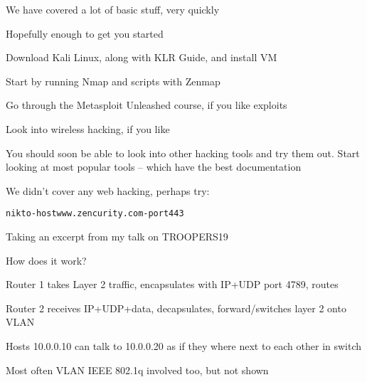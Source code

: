 \documentclass[Screen16to9,17pt]{foils}
\begin{document}
\begin{list1}
\item We have covered a lot of basic stuff, very quickly
\item Hopefully enough to get you started
\begin{list2}
\item Download Kali Linux, along with KLR Guide, and install VM
\item Start by running Nmap and scripts with Zenmap
\item Go through the Metasploit Unleashed course, if you like exploits
\item Look into wireless hacking, if you like
\item You should soon be able to look into other hacking tools and try them out. Start looking at most popular tools -- which have the best documentation
\end{list2}
\end{list1}

We didn't cover any web hacking, perhaps try:
\begin{alltt}
  nikto -host www.zencurity.com -port 443
\end{alltt}





Taking an excerpt from my talk on TROOPERS19\\
{\footnotesize{}}



How does it work?

\begin{list2}
\item Router 1 takes Layer 2 traffic, encapsulates with IP+UDP port 4789, routes
\item Router 2 receives IP+UDP+data, decapsulates, forward/switches layer 2 onto VLAN
\item Hosts 10.0.0.10 can talk to 10.0.0.20 as if they where next to each other in switch
\item Most often VLAN IEEE 802.1q involved too, but not shown
\end{list2}

\end{document}
